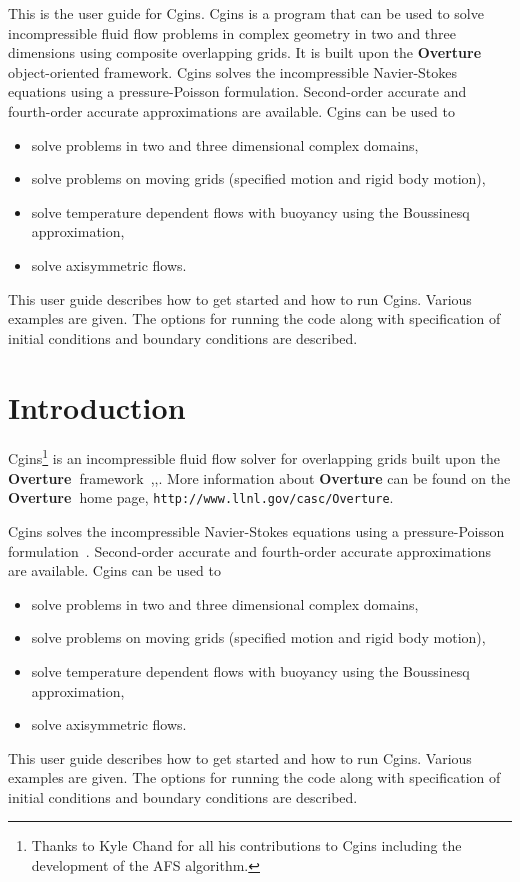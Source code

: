 \documentclass{article}
\newcommand{\Overture}{{\bf Overture\ }}
\begin{document}
\begin{flushleft}
This is the user guide for Cgins.  Cgins is a program that can be used to solve
incompressible fluid flow problems in complex geometry in two and three
dimensions using composite overlapping grids. It is built upon the \Overture
object-oriented framework.  Cgins solves the incompressible Navier-Stokes
equations using a pressure-Poisson formulation. Second-order accurate and
fourth-order accurate approximations are available.  Cgins can be used to
\begin{itemize}
  \item solve problems in two and three dimensional complex domains,
  \item solve problems on moving grids (specified motion and rigid body motion), 
  \item solve temperature dependent flows with buoyancy using the Boussinesq approximation,  
  \item solve axisymmetric flows.
\end{itemize} 
This user guide describes how to get started and how to run Cgins. Various examples are given.
The options for running the code along with specification of initial conditions and
boundary conditions are described.

\end{flushleft}

\clearpage
\tableofcontents

\clearpage
\section{Introduction}

Cgins\footnote{Thanks to Kyle Chand for all his contributions to Cgins including
the development of the AFS algorithm.} is an incompressible fluid flow solver for overlapping grids built upon
the \Overture framework~\cite{Brown97},\cite{Henshaw96a},\cite{iscope97}.
More information about
{\bf Overture} can be found on the \Overture home page, {\tt http://www.llnl.gov/\-casc/\-Overture}.


Cgins
solves the incompressible Navier-Stokes
equations using a pressure-Poisson formulation~\cite{ICNS}. Second-order accurate and
fourth-order accurate approximations are available.  Cgins can be used to
\begin{itemize}
  \item solve problems in two and three dimensional complex domains,
  \item solve problems on moving grids (specified motion and rigid body motion), 
  \item solve temperature dependent flows with buoyancy using the Boussinesq approximation,  
  \item solve axisymmetric flows.
\end{itemize} 
This user guide describes how to get started and how to run Cgins. Various examples are given.
The options for running the code along with specification of initial conditions and
boundary conditions are described.
\end{document}
